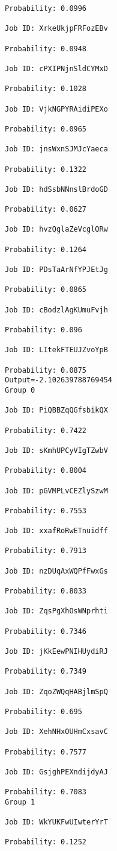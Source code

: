 \documentclass[11pt]{article}
\begin{document}
\begin{Verbatim}[commandchars=\\\{\}]
Probability: 0.0996

Job ID: XrkeUkjpFRFozEBv

Probability: 0.0948

Job ID: cPXIPNjnSldCYMxD

Probability: 0.1028

Job ID: VjkNGPYRAidiPEXo

Probability: 0.0965

Job ID: jnsWxnSJMJcYaeca

Probability: 0.1322

Job ID: hdSsbNNnslBrdoGD

Probability: 0.0627

Job ID: hvzQglaZeVcglQRw

Probability: 0.1264

Job ID: PDsTaArNfYPJEtJg

Probability: 0.0865

Job ID: cBodzlAgKUmuFvjh

Probability: 0.096

Job ID: LItekFTEUJZvoYpB

Probability: 0.0875
Output=-2.102639788769454
Group 0

Job ID: PiQBBZqQGfsbikQX

Probability: 0.7422

Job ID: sKmhUPCyVIgTZwbV

Probability: 0.8004

Job ID: pGVMPLvCEZlySzwM

Probability: 0.7553

Job ID: xxafRoRwETnuidff

Probability: 0.7913

Job ID: nzDUqAxWQPfFwxGs

Probability: 0.8033

Job ID: ZqsPgXhOsWNprhti

Probability: 0.7346

Job ID: jKkEewPNIHUydiRJ

Probability: 0.7349

Job ID: ZqoZWQqHABjlmSpQ

Probability: 0.695

Job ID: XehNHxOUHmCxsavC

Probability: 0.7577

Job ID: GsjghPEXndijdyAJ

Probability: 0.7083
Group 1

Job ID: WkYUKFwUIwterYrT

Probability: 0.1252


\end{Verbatim}
\end{document}
